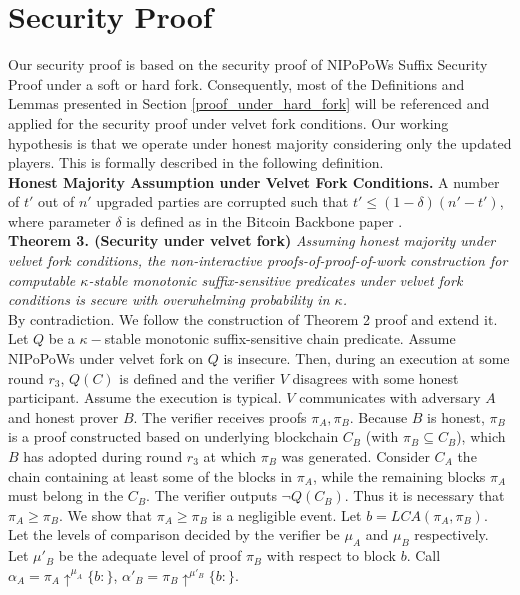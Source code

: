 \documentclass[11pt,a4paper]{article}
\begin{document}
\section{Security Proof}
Our security proof is based on the security proof of NIPoPoWs Suffix Security Proof under a soft or hard fork. Consequently, most of the Definitions and Lemmas presented in Section \ref{proof_under_hard_fork} will be referenced and applied for the security proof under velvet fork conditions.
Our working hypothesis is that we operate under honest majority considering only the updated players. This is formally described in the following definition.\\
\textbf{Honest Majority Assumption under Velvet Fork Conditions.} A number of $t'$ out of $n'$ upgraded parties are corrupted such that $t' \leq (1 - \delta)(n' - t')$, where parameter $\delta$ is defined as in the Bitcoin Backbone paper \cite{Backbone}.\\
\textbf{Theorem 3. (Security under velvet fork)} \textit{Assuming honest majority under velvet fork conditions, the non-interactive proofs-of-proof-of-work construction for computable $\kappa$-stable monotonic suffix-sensitive predicates under velvet fork conditions is secure with overwhelming probability in $\kappa$.}\\
By contradiction. We follow the construction of Theorem 2 proof and extend it. Let $Q$ be a $\kappa-$stable monotonic suffix-sensitive chain predicate. Assume NIPoPoWs under velvet fork on $Q$ is insecure. Then, during an execution at some round  $r_3$, $Q(C)$ is defined and the verifier $V$ disagrees with some honest participant. Assume the execution is typical. $V$ communicates with adversary $A$ and honest prover $B$. The verifier receives proofs $\pi_A, \pi_B$. Because $B$ is honest, $\pi_B$ is a proof constructed based on underlying blockchain $C_B$ (with $\pi_B \subseteq C_B$), which $B$ has adopted during round $r_3$ at which $\pi_B$ was generated. Consider $C_A$ the chain containing at least some of the blocks in $\pi_A$, while the remaining blocks $\pi_A$ must belong in the $C_B$. 
The verifier outputs $\neg Q(C_B)$. Thus it is necessary that $\pi_A \geq \pi_B$. We show that $\pi_A \geq \pi_B$ is a negligible event. 
Let $b = LCA(\pi_A, \pi_B)$. Let the levels of comparison decided by the verifier be $\mu_A$ and $\mu_B$ respectively. Let $\mu'_B$ be the adequate level of proof $\pi_B$  with respect to block $b$. Call $\alpha_A = \pi_A \uparrow^{\mu_A}\{b:\}$, 
$\alpha'_B = \pi_B \uparrow^{\mu'_B}\{b:\}$.\\
\end{document}
